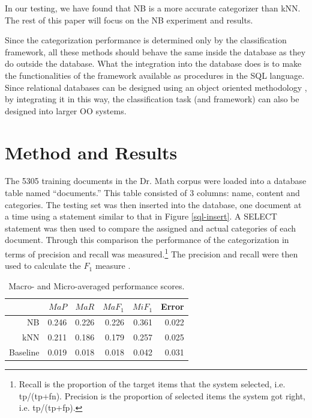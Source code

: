 \documentclass{article}
\begin{document}
In our testing, we have found that NB is a more accurate categorizer
than kNN.  The rest of this paper will focus on the NB experiment and results.

Since the categorization performance is determined only by the classification 
framework, all these methods should behave the same inside the
database as they do outside 
the database. What the integration into the database does is to make the 
functionalities of the framework available as procedures in the SQL language.
Since relational databases can be designed using an object oriented methodology \cite{blaha:88,
rumbaugh:91}, by integrating it in this way, the classification task 
(and framework) can also be designed into larger OO systems.

\section{Method and Results}
\label{results}

 
The 5305 training documents in the Dr. Math corpus were loaded into a database 
table named ``documents.'' This table consisted of 3 columns: name, content and 
categories. The testing set was then inserted into the database, one document at a time 
using a statement similar to that in Figure \ref{sql-insert}. A SELECT
statement was then used to compare the assigned and actual categories
of each document. Through this comparison the performance of the
categorization in terms of precision and recall was
measured.\footnote{Recall is the proportion of the target items that
the system selected, i.e. tp/(tp+fn).  Precision is the proportion of
selected items the system got right, i.e. tp/(tp+fp).} The precision
and recall were then used
to calculate the $F_1$ measure \cite{calvo:01,sebastiani:02}.

\begin{table}
\begin{tabular}{|r|r|r|r|r|r|}
\hline
         & $MaP$   & $MaR$   & $MaF_1$ & $MiF_1$ & Error \\ \hline
NB       & 0.246   & 0.226   & 0.226   & 0.361   & 0.022 \\ \hline
kNN      & 0.211   & 0.186   & 0.179   & 0.257   & 0.025 \\ \hline
Baseline & 0.019   & 0.018   & 0.018   & 0.042   & 0.031 \\ \hline
\end{tabular}
\caption{Macro- and Micro-averaged performance scores.}
\label{results-main}
\end{table}
\end{document}
